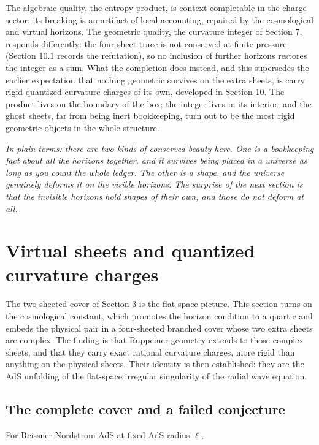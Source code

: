 \documentclass[11pt]{article}
\begin{document}
The algebraic quality, the entropy product, is context-completable in the charge sector: its breaking is an artifact of local accounting, repaired by the cosmological and virtual horizons. The geometric quality, the curvature integer of Section 7, responds differently: the four-sheet trace is not conserved at finite pressure (Section 10.1 records the refutation), so no inclusion of further horizons restores the integer as a sum. What the completion does instead, and this supersedes the earlier expectation that nothing geometric survives on the extra sheets, is carry rigid quantized curvature charges of its own, developed in Section 10. The product lives on the boundary of the box; the integer lives in its interior; and the ghost sheets, far from being inert bookkeeping, turn out to be the most rigid geometric objects in the whole structure.

\emph{In plain terms: there are two kinds of conserved beauty here. One is a bookkeeping fact about all the horizons together, and it survives being placed in a universe as long as you count the whole ledger. The other is a shape, and the universe genuinely deforms it on the visible horizons. The surprise of the next section is that the invisible horizons hold shapes of their own, and those do not deform at all.}



\section{Virtual sheets and quantized curvature charges}

The two-sheeted cover of Section 3 is the flat-space picture. This section turns on the cosmological constant, which promotes the horizon condition to a quartic and embeds the physical pair in a four-sheeted branched cover whose two extra sheets are complex. The finding is that Ruppeiner geometry extends to those complex sheets, and that they carry exact rational curvature charges, more rigid than anything on the physical sheets. Their identity is then established: they are the AdS unfolding of the flat-space irregular singularity of the radial wave equation.

\subsection{The complete cover and a failed conjecture}

For Reissner-Nordstrom-AdS at fixed AdS radius $\ell$,
\end{document}
